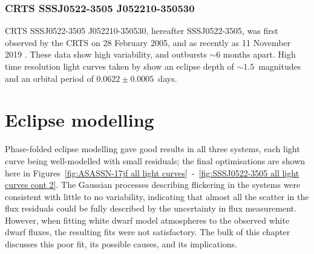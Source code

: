 \subsubsection{CRTS SSSJ0522-3505 J052210-350530}
\label{sect:three white dwarfs:SSSJ0522-3505 prior observations}
CRTS SSSJ0522-3505 J052210-350530, hereafter SSSJ0522-3505, was first observed by the CRTS on 28 February 2005, and as recently as 11 November 2019 \citep{drake2009}. These data show high variability, and outbursts $\sim$6 months apart. High time resolution light curves taken by \citet{paterson2019} show an eclipse depth of $\sim1.5$\ magnitudes and an orbital period of $0.0622 \pm 0.0005$\ days.


\section{Eclipse modelling}
\label{sect:three white dwarfs:eclipse modelling results}

Phase-folded eclipse modelling gave good results in all three systems, each light curve being well-modelled with small residuals; the final optimisations are shown here in Figures~\ref{fig:ASASSN-17jf all light curves}~-~\ref{fig:SSSJ0522-3505 all light curves cont 2}.
The Gaussian processes describing flickering in the systems were consistent with little to no variability, indicating that almost all the scatter in the flux residuals could be fully described by the uncertainty in flux measurement.
However, when fitting white dwarf model atmospheres to the observed white dwarf fluxes, the resulting fits were not satisfactory. The bulk of this chapter discusses this poor fit, its possible causes, and its implications.


